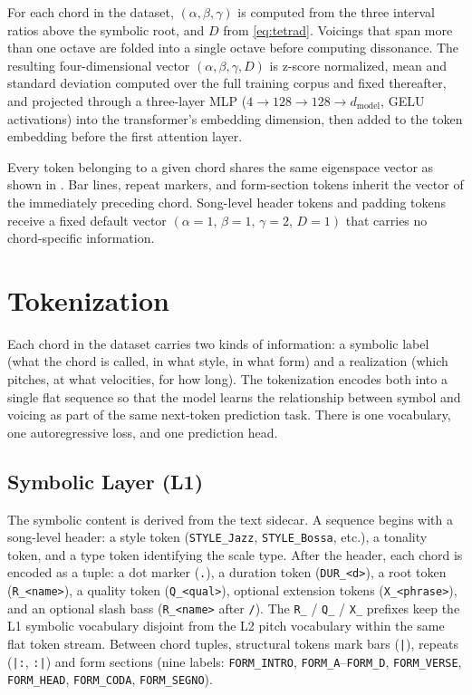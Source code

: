 \documentclass{aimc2026}
\begin{document}
For each chord in the dataset, $(\alpha, \beta, \gamma)$ is computed from the three interval ratios above the symbolic root, and $D$ from \cref{eq:tetrad}. Voicings that span more than one octave are folded into a single octave before computing dissonance. The resulting four-dimensional vector $(\alpha, \beta, \gamma, D)$ is z-score normalized, mean and standard deviation computed over the full training corpus and fixed thereafter, and projected through a three-layer MLP ($4 \!\rightarrow\! 128 \!\rightarrow\! 128 \!\rightarrow\! d_{\text{model}}$, GELU activations) into the transformer's embedding dimension, then added to the token embedding before the first attention layer.

Every token belonging to a given chord shares the same eigenspace vector as shown in . Bar lines, repeat markers, and form-section tokens inherit the vector of the immediately preceding chord. Song-level header tokens and padding tokens receive a fixed default vector $(\alpha\!=\!1,\,\beta\!=\!1,\,\gamma\!=\!2,\,D\!=\!1)$ that carries no chord-specific information.

\section{Tokenization}
\label{sec:tokenization}

Each chord in the dataset carries two kinds of information: a symbolic label (what the chord is called, in what style, in what form) and a realization (which pitches, at what velocities, for how long). The tokenization encodes both into a single flat sequence so that the model learns the relationship between symbol and voicing as part of the same next-token prediction task. There is one vocabulary, one autoregressive loss, and one prediction head.

\subsection{Symbolic Layer (L1)}
\label{sec:l1}

The symbolic content is derived from the text sidecar. A sequence begins with a song-level header: a style token (\texttt{STYLE\_Jazz}, \texttt{STYLE\_Bossa}, etc.), a tonality token, and a type token identifying the scale type. After the header, each chord is encoded as a tuple: a dot marker (\texttt{.}), a duration token (\texttt{DUR\_<d>}), a root token (\texttt{R\_<name>}), a quality token (\texttt{Q\_<qual>}), optional extension tokens (\texttt{X\_<phrase>}), and an optional slash bass (\texttt{R\_<name>} after \texttt{/}). The \texttt{R\_} / \texttt{Q\_} / \texttt{X\_} prefixes keep the L1 symbolic vocabulary disjoint from the L2 pitch vocabulary within the same flat token stream. Between chord tuples, structural tokens mark bars (\texttt{|}), repeats (\texttt{|:}, \texttt{:|}) and form sections (nine labels: \texttt{FORM\_INTRO}, \texttt{FORM\_A}--\texttt{FORM\_D}, \texttt{FORM\_VERSE}, \texttt{FORM\_HEAD}, \texttt{FORM\_CODA}, \texttt{FORM\_SEGNO}).
\end{document}
